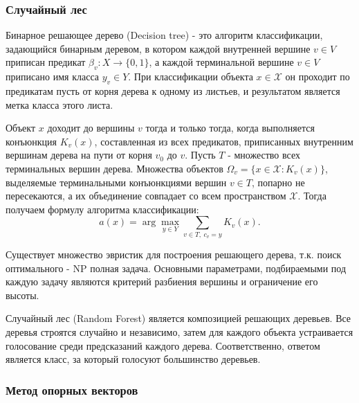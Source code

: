 \documentclass[14pt]{extarticle}
\begin{document}
\subsubsection{Случайный лес}

\par
Бинарное решающее дерево (Decision tree) - это алгоритм классификации, задающийся бинарным
деревом, в котором каждой внутренней вершине $v \in V$ приписан предикат 
$\beta_v:X\to\{0, 1\}$, а каждой терминальной вершине $v \in V$ приписано имя класса 
$y_v \in Y$. При классификации объекта $x \in \mathcal{X}$ он проходит по предикатам
пусть от корня дерева к одному из листьев, и результатом является метка класса этого листа.
\par
Объект $x$ доходит до вершины $v$ тогда и только тогда, когда выполняется конъюнкция
$K_v(x)$, составленная из всех предикатов, приписанных внутренним вершинам дерева
на пути от корня $v_0$ до $v$. Пусть $T$ - множество всех терминальных вершин дерева. 
Множества объектов $\Omega_v=\{x \in \mathcal{X} : K_v(x)\}$, выделяемые терминальными
конъюнкциями вершин $v \in T$, попарно не пересекаются, а их объединение совпадает
со всем пространством $\mathcal{X}$. Тогда получаем формулу алгоритма классификации:
\[
    a(x) = \arg\max_{y \in Y} \sum_{v \in T,\ c_v=y} K_v(x).
\]
\par
Существует множество эвристик для построения решающего дерева, т.к. поиск оптимального - 
NP полная задача. Основными параметрами, подбираемыми под каждую задачу являются
критерий разбиения вершины и ограничение его высоты.
\par
Случайный лес (Random Forest) является композицией решающих деревьев. Все деревья строятся
случайно и независимо, затем для каждого объекта устраивается голосование среди
предсказаний каждого дерева. Соответственно, ответом является класс, за который голосуют
большинство деревьев.

\subsubsection{Метод опорных векторов}
\end{document}
